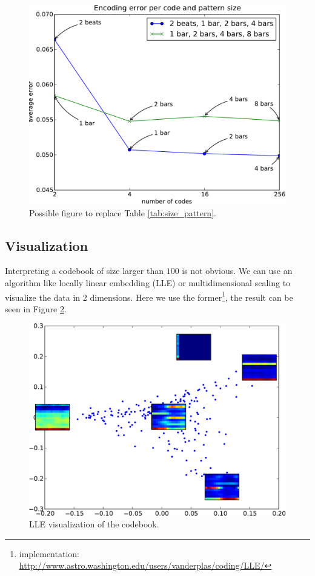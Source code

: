 \documentclass{article}
\begin{document}
\begin{figure}[htb]
\begin{center}
\includegraphics[width=.99\columnwidth]{codesize_patternsize}
\end{center}
\caption{{Possible figure to replace Table \ref{tab:size_pattern}.}}
\label{fig:size_pattern}
\end{figure}


\subsection{Visualization}
Interpreting a codebook of size larger than $100$ is not obvious.
We can use an algorithm like locally linear embedding \cite{Roweis2000} (LLE) 
or multidimensional scaling \cite{Kruskal1964} to visualize the data in
2 dimensions. Here we use the former\footnote{implementation: 
\url{http://www.astro.washington.edu/users/vanderplas/coding/LLE/}}, the
result can be seen in Figure \ref{fig:lle}.


\begin{figure}[htb]
\begin{center}
\includegraphics[width=.9\columnwidth]{codes_lle}
\end{center}
\caption{{LLE visualization of the codebook.}}
\label{fig:lle}
\end{figure}
\end{document}
